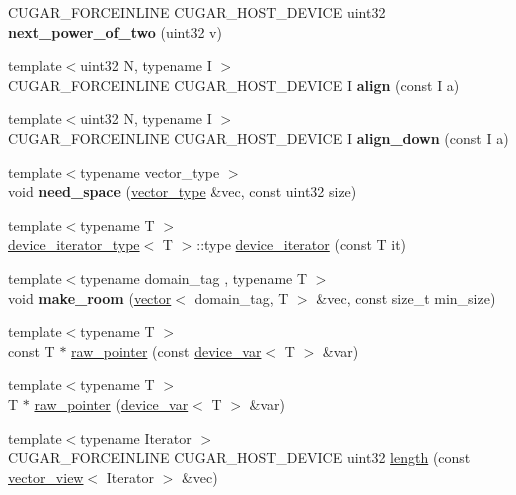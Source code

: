\begin{DoxyCompactItemize}
\item 
C\+U\+G\+A\+R\+\_\+\+F\+O\+R\+C\+E\+I\+N\+L\+I\+NE C\+U\+G\+A\+R\+\_\+\+H\+O\+S\+T\+\_\+\+D\+E\+V\+I\+CE uint32 {\bfseries next\+\_\+power\+\_\+of\+\_\+two} (uint32 v)
\item 
{\footnotesize template$<$uint32 N, typename I $>$ }\\C\+U\+G\+A\+R\+\_\+\+F\+O\+R\+C\+E\+I\+N\+L\+I\+NE C\+U\+G\+A\+R\+\_\+\+H\+O\+S\+T\+\_\+\+D\+E\+V\+I\+CE I {\bfseries align} (const I a)
\item 
{\footnotesize template$<$uint32 N, typename I $>$ }\\C\+U\+G\+A\+R\+\_\+\+F\+O\+R\+C\+E\+I\+N\+L\+I\+NE C\+U\+G\+A\+R\+\_\+\+H\+O\+S\+T\+\_\+\+D\+E\+V\+I\+CE I {\bfseries align\+\_\+down} (const I a)
\item 
\mbox{\label{namespacecugar_ad176fa14956e2d1298124703e5536a1e}} 
{\footnotesize template$<$typename vector\+\_\+type $>$ }\\void {\bfseries need\+\_\+space} (\hyperlink{structcugar_1_1vector__type}{vector\+\_\+type} \&vec, const uint32 size)
\item 
{\footnotesize template$<$typename T $>$ }\\\hyperlink{structcugar_1_1device__iterator__type}{device\+\_\+iterator\+\_\+type}$<$ T $>$\+::type \hyperlink{namespacecugar_a0e75b2d03baebc99db6b620e0c962b5c}{device\+\_\+iterator} (const T it)
\item 
\mbox{\label{namespacecugar_a1e18813d477a2b70af9adb347ac719ac}} 
{\footnotesize template$<$typename domain\+\_\+tag , typename T $>$ }\\void {\bfseries make\+\_\+room} (\hyperlink{structcugar_1_1vector}{vector}$<$ domain\+\_\+tag, T $>$ \&vec, const size\+\_\+t min\+\_\+size)
\item 
{\footnotesize template$<$typename T $>$ }\\const T $\ast$ \hyperlink{namespacecugar_a7edcd356c9e90087a3b1100eec65438a}{raw\+\_\+pointer} (const \hyperlink{structcugar_1_1device__var}{device\+\_\+var}$<$ T $>$ \&var)
\item 
{\footnotesize template$<$typename T $>$ }\\T $\ast$ \hyperlink{namespacecugar_a2b9a0dd7326d84ea851ab4cee4edaec4}{raw\+\_\+pointer} (\hyperlink{structcugar_1_1device__var}{device\+\_\+var}$<$ T $>$ \&var)
\item 
{\footnotesize template$<$typename Iterator $>$ }\\C\+U\+G\+A\+R\+\_\+\+F\+O\+R\+C\+E\+I\+N\+L\+I\+NE C\+U\+G\+A\+R\+\_\+\+H\+O\+S\+T\+\_\+\+D\+E\+V\+I\+CE uint32 \hyperlink{group___basic_ga6a0f89325f62dc313d300e36f2a26b55}{length} (const \hyperlink{structcugar_1_1vector__view}{vector\+\_\+view}$<$ Iterator $>$ \&vec)

\end{DoxyCompactItemize}
